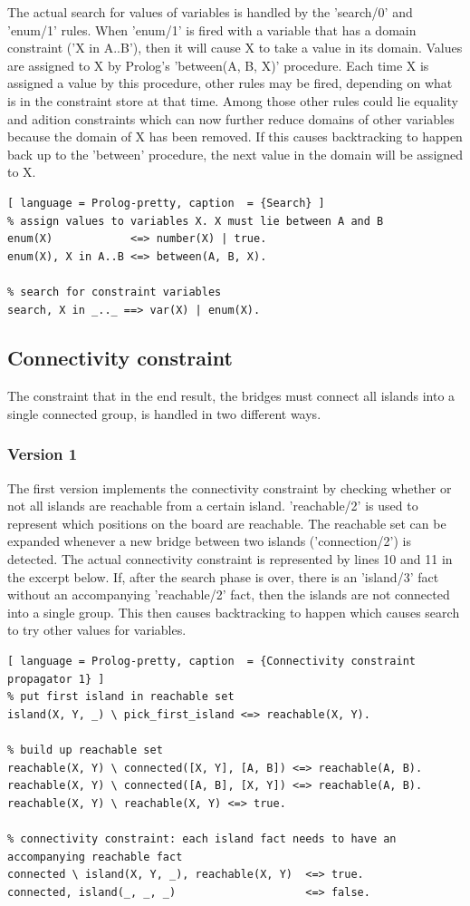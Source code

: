 \documentclass{report}
\begin{document}
The actual search for values of variables is handled by the 'search/0' and 'enum/1' rules. When 'enum/1' is fired with a variable that has a domain constraint ('X in A..B'), then it will cause X to take a value in its domain. Values are assigned to X by Prolog's 'between(A, B, X)' procedure. Each time X is assigned a value by this procedure, other rules may be fired, depending on what is in the constraint store at that time. Among those other rules could lie equality and adition constraints which can now further reduce domains of other variables because the domain of X has been removed. If this causes backtracking to happen back up to the 'between' procedure, the next value in the domain will be assigned to X.
\newpage
\begin{lstlisting}[ language = Prolog-pretty, caption  = {Search} ]
% assign values to variables X. X must lie between A and B
enum(X)            <=> number(X) | true.
enum(X), X in A..B <=> between(A, B, X).

% search for constraint variables
search, X in _.._ ==> var(X) | enum(X).
\end{lstlisting}

\subsection{Connectivity constraint}
The constraint that in the end result, the bridges must connect all islands into a single connected group, is handled in two different ways.

\subsubsection{Version 1}
The first version implements the connectivity constraint by checking whether or not all islands are reachable from a certain island. 'reachable/2' is used to represent which positions on the board are reachable. The reachable set can be expanded whenever a new bridge between two islands ('connection/2') is detected. The actual connectivity constraint is represented by lines 10 and 11 in the excerpt below. If, after the search phase is over, there is an 'island/3' fact without an accompanying 'reachable/2' fact, then the islands are not connected into a single group. This then causes backtracking to happen which causes search to try other values for variables.
\begin{lstlisting}[ language = Prolog-pretty, caption  = {Connectivity constraint propagator 1} ]
% put first island in reachable set
island(X, Y, _) \ pick_first_island <=> reachable(X, Y).

% build up reachable set
reachable(X, Y) \ connected([X, Y], [A, B]) <=> reachable(A, B).
reachable(X, Y) \ connected([A, B], [X, Y]) <=> reachable(A, B).
reachable(X, Y) \ reachable(X, Y) <=> true.

% connectivity constraint: each island fact needs to have an accompanying reachable fact
connected \ island(X, Y, _), reachable(X, Y)  <=> true.
connected, island(_, _, _)                    <=> false.
\end{lstlisting}
\end{document}
